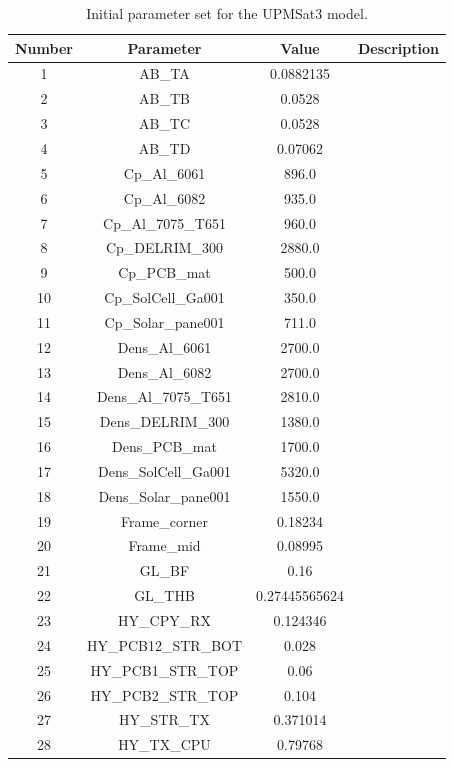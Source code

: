     \begin{table}[H]
        \centering
        \caption{Initial parameter set for the UPMSat3 model.}
        \label{tab:initialparamsUPMSat3}
    \begin{tabular}{cccc}
        \hline
        Number & Parameter & Value & Description \\
        \hline
        1 & AB\_TA & 0.0882135 &  \\
        2 & AB\_TB & 0.0528 &  \\
        3 & AB\_TC & 0.0528 &  \\
        4 & AB\_TD & 0.07062 &  \\
        5 & Cp\_Al\_6061 & 896.0 &  \\
        6 & Cp\_Al\_6082 & 935.0 &  \\
        7 & Cp\_Al\_7075\_T651 & 960.0 &  \\
        8 & Cp\_DELRIM\_300 & 2880.0 &  \\
        9 & Cp\_PCB\_mat & 500.0 &  \\
        10 & Cp\_SolCell\_Ga001 & 350.0 &  \\
        11 & Cp\_Solar\_pane001 & 711.0 &  \\
        12 & Dens\_Al\_6061 & 2700.0 &  \\
        13 & Dens\_Al\_6082 & 2700.0 &  \\
        14 & Dens\_Al\_7075\_T651 & 2810.0 &  \\
        15 & Dens\_DELRIM\_300 & 1380.0 &  \\
        16 & Dens\_PCB\_mat & 1700.0 &  \\
        17 & Dens\_SolCell\_Ga001 & 5320.0 &  \\
        18 & Dens\_Solar\_pane001 & 1550.0 &  \\
        19 & Frame\_corner & 0.18234 &  \\
        20 & Frame\_mid & 0.08995 &  \\
        21 & GL\_BF & 0.16 &  \\
        22 & GL\_THB & 0.27445565624 &  \\
        23 & HY\_CPY\_RX & 0.124346 &  \\
        24 & HY\_PCB12\_STR\_BOT & 0.028 &  \\
        25 & HY\_PCB1\_STR\_TOP & 0.06 &  \\
        26 & HY\_PCB2\_STR\_TOP & 0.104 &  \\
        27 & HY\_STR\_TX & 0.371014 &  \\
        28 & HY\_TX\_CPU & 0.79768 &  \\

\end{tabular}
\end{table}
